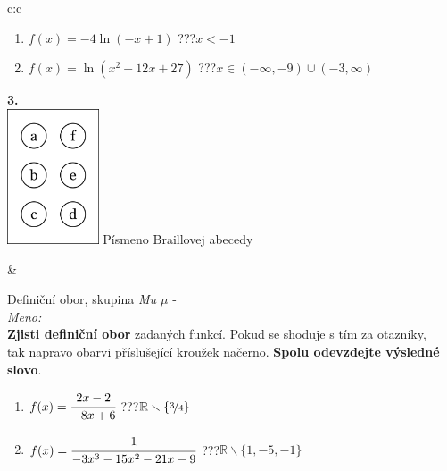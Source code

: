\documentclass[10pt]{report}
\begin{document}
\begin{tabular}{c:c}
\begin{minipage}[c][99mm][t]{0.49\linewidth}
\begin{center}
\begin{minipage}{0.77\linewidth}
\begin{center}
\begin{varwidth}{\textwidth}
\begin{enumerate}
\item $f(x)=-4\ln{(-x+1)}$\quad \dotfill\; ???\;\dotfill \quad $x<-1$
\item $f(x)=\ln{(x^2+12x+27)}$\quad \dotfill\; ???\;\dotfill \quad $x\in(-\infty , -9)\cup(-3 , \infty)$
\end{enumerate}
\end{varwidth}
\end{center}
\end{minipage}
\begin{minipage}{0.20\linewidth}
\begin{center}
{\Huge\bfseries 3.} \\[2mm]
\includegraphics[height=40mm]{../images/braille.png}
{\small Písmeno Braillovej abecedy}
\end{center}
\end{minipage}
\end{center}
\end{minipage}
&
\begin{minipage}[c][99mm][t]{0.49\linewidth}
\begin{center}
\vspace{7mm}
{\huge Definiční obor, skupina \textit{Mu $\mu$} -}\\[4.5mm]
\textit{Meno:}\phantom{xxxxxxxxxxxxxxxxxxxxxxxxxxxxxxxxxxxxxxxxxxxxxxxxxxxxxxxxxxxxxxxxx}\\[3.5mm]
\textbf{Zjisti definiční obor} zadaných funkcí. Pokud se shoduje s tím za otazníky,\\tak napravo obarvi příslušející kroužek načerno. \textbf{Spolu odevzdejte výsledné slovo}.\\[3mm]
\begin{minipage}{0.77\linewidth}
\begin{center}
\begin{varwidth}{\textwidth}
\begin{enumerate}
\normalsize
\item $f(x)=\cfrac{2x-2}{-8x+6}$\quad \dotfill\; ???\;\dotfill \quad $\mathbb{R}\smallsetminus\{\nicefrac{3}{4}\}$
\item $f(x)=\cfrac{1}{-3x^3-15x^2-21x-9}$\quad \dotfill\; ???\;\dotfill \quad $\mathbb{R}\smallsetminus\{1,-5,-1\}$

\end{enumerate}
\end{varwidth}
\end{center}
\end{minipage}
\end{center}
\end{minipage}
\end{tabular}
\end{document}
